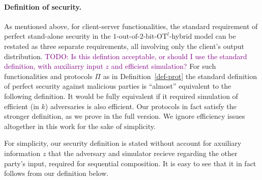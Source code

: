 \documentclass[a4paper]{article}
\newtheorem{definition}{Definition}[section]
\newcommand{\OT}[2]{#1\text{-out-of-}#2\text{-bit-OT}}
\newcommand{\atodo}[1]{\textcolor{purple}{TODO: #1}}
\begin{document}
\paragraph{Definition of security.}
As mentioned above, for client-server functionalities, the standard requirement of perfect stand-alone security in the ${\OT{1}{2}}^l$-hybrid model can be restated as three separate requirements, all involving only the client's output distribution.
\atodo{Is this defintion acceptable, or should I use the standard definition, with auxiliarry input $z$ and efficient simulation?}
For such functionalities and protocols $\Pi$ as in Definition~\ref{def-prot} the standard definition of perfect security against malicious parties is ``almost'' equivalent to the following definition.
It would be fully equivalent if it required simulation of efficient (in $k$) adversaries is also efficient. Our protocols in fact satisfy the stronger definition, as we prove in the full version. We ignore efficiency issues altogether in this work for the sake of simplicity. 

For simplicity, our security definition is stated without account for axuiliary information $z$ that the adversary and simulator recieve regarding the other party's input, required for sequential composition. It is easy to see that it in fact follows from our definition below. 
\end{document}
